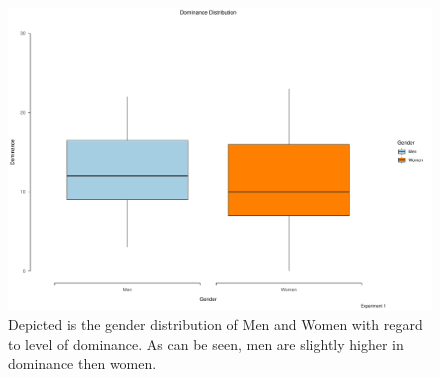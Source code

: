\documentclass[
  donotrepeattitle,doc, 12pt, a4paper,floatsintext]{apa7}
\begin{document}
\begin{figure}

{\centering \includegraphics{Output_Files/DoPL-Experiment_files/figure-latex/DominanceExperiment1-1} 

}

\caption{Depicted is the gender distribution of Men and Women with regard to level of dominance. As can be seen, men are slightly higher in dominance then women.}\label{fig:DominanceExperiment1}
\end{figure}
\end{document}
